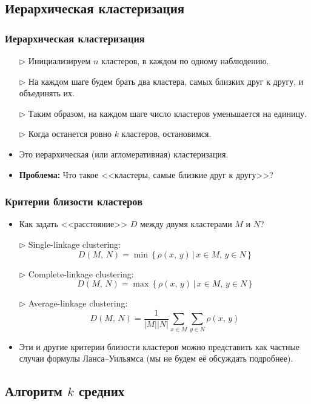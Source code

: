 \documentclass[unicode]{beamer}
\begin{document}
\subsection{Иерархическая кластеризация}

\begin{frame}[t]
\frametitle{Иерархическая кластеризация}

\begin{itemize}
  \item[$\rhd$] Инициализируем $n$ кластеров, в каждом по одному наблюдению.
  \item[$\rhd$] На каждом шаге будем брать два кластера, самых близких друг к другу, и объединять их.
  \item[$\rhd$] Таким образом, на каждом шаге число кластеров уменьшается на единицу.
  \item[$\rhd$] Когда останется ровно $k$ кластеров, остановимся.
\item Это иерархическая (или агломеративная) кластеризация.
\item \textbf{Проблема:} Что такое <<кластеры, самые близкие друг к другу>>?
\end{itemize}

\end{frame}

\begin{frame}[t]
\frametitle{Критерии близости кластеров}

\begin{itemize}
\item Как задать <<расстояние>> $D$ между двумя кластерами $M$ и $N$?
\item[$\rhd$] Single-linkage clustering:
$$
D(M,\, N) = \min\, \{\, \rho(x,\, y)\, |\, x \in M,\, y \in N \,\}
$$
\item[$\rhd$] Complete-linkage clustering:
$$
D(M,\, N) = \max\, \{\, \rho(x,\, y)\, |\, x \in M,\, y \in N \,\}
$$
\item[$\rhd$] Average-linkage clustering:
$$
D(M,\, N) = \frac{1}{|M||N|} \sum_{x \in M} \sum_{y \in N}{\rho(x,\, y)}
$$
\item Эти и другие критерии близости кластеров можно представить как частные случаи формулы Ланса--Уильямса (мы не будем её обсуждать подробнее).
\end{itemize}

\end{frame}

\subsection{Алгоритм $k$ средних}
\end{document}
